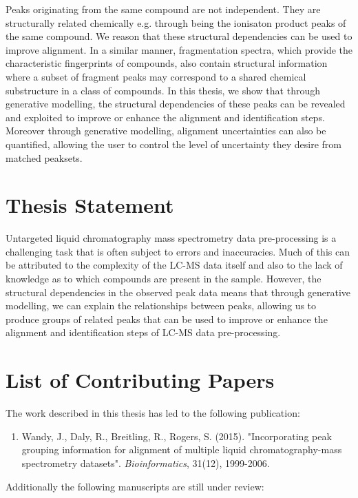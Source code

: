 Peaks originating from the same compound are not independent. They are structurally related chemically e.g. through being the ionisaton product peaks of the same compound. We reason that these structural dependencies can be used to improve alignment. In a similar manner, fragmentation spectra, which provide the characteristic fingerprints of compounds, also contain structural information where a subset of fragment peaks may correspond to a shared chemical substructure in a class of compounds. In this thesis, we show that through generative modelling, the structural dependencies of these peaks can be revealed and exploited to improve or enhance the alignment and identification steps. Moreover through generative modelling, alignment uncertainties can also be quantified, allowing the user to control the level of uncertainty they desire from matched peaksets.

\section{Thesis Statement\label{sub:thesis-statement}}

Untargeted liquid chromatography mass spectrometry data pre-processing is a challenging task that is often subject to errors and inaccuracies. Much of this can be attributed to the complexity of the LC-MS data itself and also to the lack of knowledge as to which compounds are present in the sample. However, the structural dependencies in the observed peak data means that through generative modelling, we can explain the relationships between peaks, allowing us to produce groups of related peaks that can be used to improve or enhance the alignment and identification steps of LC-MS data pre-processing.

\section{List of Contributing Papers}

The work described in this thesis has led to the following publication:

\begin{enumerate}
\item Wandy, J., Daly, R., Breitling, R., Rogers, S. (2015). "Incorporating peak grouping information for alignment of multiple liquid chromatography-mass spectrometry datasets". \textit{Bioinformatics}, 31(12), 1999-2006.
\end{enumerate}

Additionally the following manuscripts are still under review:

